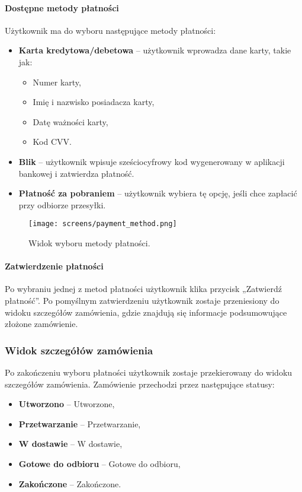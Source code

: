 \documentclass[12pt,a4paper,oneside]{article}
\theoremstyle{definition}
\numberwithin{equation}{section}
\begin{document}
\paragraph{Dostępne metody płatności}
Użytkownik ma do wyboru następujące metody płatności:
\begin{itemize}
    \item \textbf{Karta kredytowa/debetowa} – użytkownik wprowadza dane karty, takie jak:
    \begin{itemize}
        \item Numer karty,
        \item Imię i nazwisko posiadacza karty,
        \item Datę ważności karty,
        \item Kod CVV.
    \end{itemize}
    \item \textbf{Blik} – użytkownik wpisuje sześciocyfrowy kod wygenerowany w aplikacji bankowej i zatwierdza płatność.

    \item \textbf{Płatność za pobraniem} – użytkownik wybiera tę opcję, jeśli chce zapłacić przy odbiorze przesyłki.
\end{itemize}

\begin{figure}[H]
    \centering
    \texttt{[image: screens/payment\_method.png]}
    \caption{Widok wyboru metody płatności.}
    \label{fig:payment_method}
\end{figure}

\paragraph{Zatwierdzenie płatności}
Po wybraniu jednej z metod płatności użytkownik klika przycisk „Zatwierdź płatność”. Po pomyślnym zatwierdzeniu użytkownik zostaje przeniesiony do widoku szczegółów zamówienia, gdzie znajdują się informacje podsumowujące złożone zamówienie.





\subsubsection{Widok szczegółów zamówienia}
Po zakończeniu wyboru płatności użytkownik zostaje przekierowany do widoku szczegółów zamówienia. Zamówienie przechodzi przez następujące statusy:
\begin{itemize}
    \item \textbf{Utworzono} – Utworzone,
    \item \textbf{Przetwarzanie} – Przetwarzanie,
    \item \textbf{W dostawie} – W dostawie,
    \item \textbf{Gotowe do odbioru} – Gotowe do odbioru,
    \item \textbf{Zakończone} – Zakończone.
\end{itemize}
\end{document}

